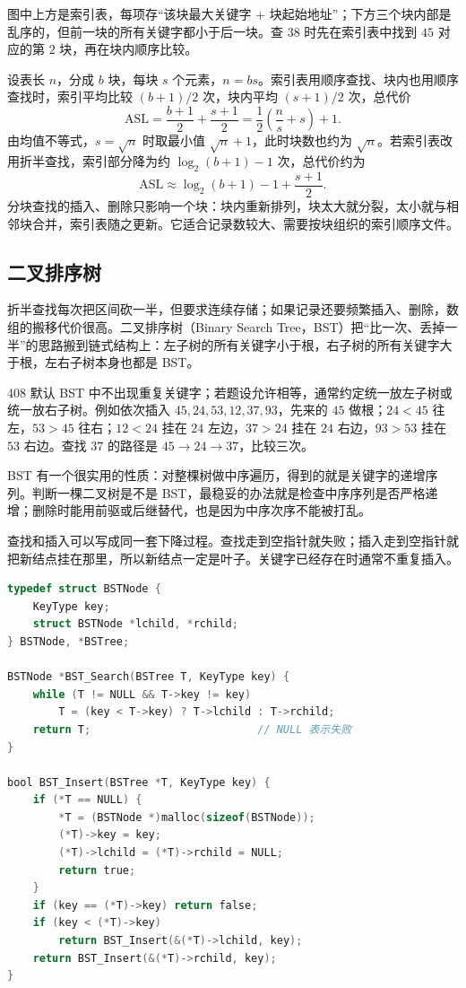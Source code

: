 {\small\color{MutedText} 图中上方是索引表，每项存“该块最大关键字 + 块起始地址”；下方三个块内部是乱序的，但前一块的所有关键字都小于后一块。查 $38$ 时先在索引表中找到 $45$ 对应的第 $2$ 块，再在块内顺序比较。}

设表长 $n$，分成 $b$ 块，每块 $s$ 个元素，$n=bs$。索引表用顺序查找、块内也用顺序查找时，索引平均比较 $(b+1)/2$ 次，块内平均 $(s+1)/2$ 次，总代价
\[
\mathrm{ASL}=\frac{b+1}{2}+\frac{s+1}{2}
=\frac{1}{2}\left(\frac{n}{s}+s\right)+1.
\]
由均值不等式，$s=\sqrt n$ 时取最小值 $\sqrt n+1$，此时块数也约为 $\sqrt n$。若索引表改用折半查找，索引部分降为约 $\log_2(b+1)-1$ 次，总代价约为
\[
\mathrm{ASL}\approx\log_2(b+1)-1+\frac{s+1}{2}.
\]
分块查找的插入、删除只影响一个块：块内重新排列，块太大就分裂，太小就与相邻块合并，索引表随之更新。它适合记录数较大、需要按块组织的索引顺序文件。

\subsection{二叉排序树}

折半查找每次把区间砍一半，但要求连续存储；如果记录还要频繁插入、删除，数组的搬移代价很高。二叉排序树（Binary Search Tree，BST）把“比一次、丢掉一半”的思路搬到链式结构上：左子树的所有关键字小于根，右子树的所有关键字大于根，左右子树本身也都是 BST。

408 默认 BST 中不出现重复关键字；若题设允许相等，通常约定统一放左子树或统一放右子树。例如依次插入 $45,24,53,12,37,93$，先来的 $45$ 做根；$24<45$ 往左，$53>45$ 往右；$12<24$ 挂在 $24$ 左边，$37>24$ 挂在 $24$ 右边，$93>53$ 挂在 $53$ 右边。查找 $37$ 的路径是 $45\to24\to37$，比较三次。

BST 有一个很实用的性质：对整棵树做中序遍历，得到的就是关键字的递增序列。判断一棵二叉树是不是 BST，最稳妥的办法就是检查中序序列是否严格递增；删除时能用前驱或后继替代，也是因为中序次序不能被打乱。

查找和插入可以写成同一套下降过程。查找走到空指针就失败；插入走到空指针就把新结点挂在那里，所以新结点一定是叶子。关键字已经存在时通常不重复插入。

\begin{lstlisting}[language=C]
typedef struct BSTNode {
    KeyType key;
    struct BSTNode *lchild, *rchild;
} BSTNode, *BSTree;

BSTNode *BST_Search(BSTree T, KeyType key) {
    while (T != NULL && T->key != key)
        T = (key < T->key) ? T->lchild : T->rchild;
    return T;                          // NULL 表示失败
}

bool BST_Insert(BSTree *T, KeyType key) {
    if (*T == NULL) {
        *T = (BSTNode *)malloc(sizeof(BSTNode));
        (*T)->key = key;
        (*T)->lchild = (*T)->rchild = NULL;
        return true;
    }
    if (key == (*T)->key) return false;
    if (key < (*T)->key)
        return BST_Insert(&(*T)->lchild, key);
    return BST_Insert(&(*T)->rchild, key);
}
\end{lstlisting}

